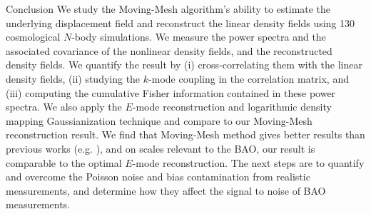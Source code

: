\begin{section}{Conclusion}
  \label{sec:conclusion}
  We study the Moving-Mesh algorithm's ability to estimate the underlying displacement 
  field and reconstruct the linear density fields using 130 cosmological $N$-body 
  simulations.  We measure the power spectra and the associated covariance of the 
  nonlinear density fields, and the reconstructed density fields.  We quantify the 
  result by (i) cross-correlating them with the linear density fields, (ii) studying 
  the $k$-mode coupling in the correlation matrix, and (iii) computing the cumulative 
  Fisher information contained in these power spectra.  We also apply the $E$-mode 
  reconstruction and logarithmic density mapping Gaussianization technique and compare 
  to our Moving-Mesh reconstruction result.  We find that Moving-Mesh method gives better results than previous works
  (e.g. \cite{bib:Mark2009,bib:Zhang2011,bib:HarnoisD2013}), and on scales 
  relevant to the BAO, our result is comparable to the optimal $E$-mode reconstruction.  
  The next steps are to quantify and overcome the Poisson noise and bias contamination 
  from realistic measurements, and determine how they affect the signal to noise of 
  BAO measurements.  

%
\end{section}

